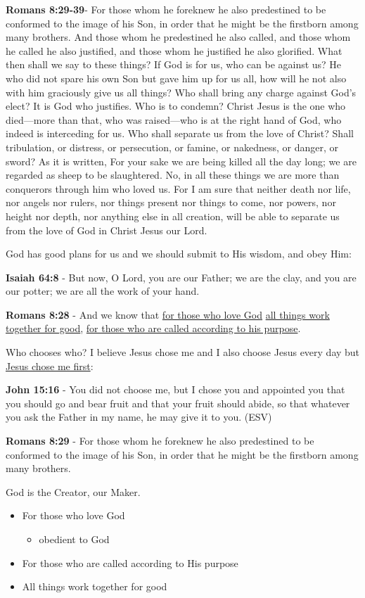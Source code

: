 \documentclass[11pt]{article}
\begin{document}
\textbf{Romans 8:29-39}- For those whom he foreknew he also predestined to be conformed to the image of his Son, in order that he might be the firstborn among many brothers. And those whom he predestined he also called, and those whom he called he also justified, and those whom he justified he also glorified. What then shall we say to these things? If God is for us, who can be against us? He who did not spare his own Son but gave him up for us all, how will he not also with him graciously give us all things? Who shall bring any charge against God's elect? It is God who justifies. Who is to condemn? Christ Jesus is the one who died—more than that, who was raised—who is at the right hand of God, who indeed is interceding for us. Who shall separate us from the love of Christ? Shall tribulation, or distress, or persecution, or famine, or nakedness, or danger, or sword? As it is written, For your sake we are being killed all the day long; we are regarded as sheep to be slaughtered. No, in all these things we are more than conquerors through him who loved us. For I am sure that neither death nor life, nor angels nor rulers, nor things present nor things to come, nor powers, nor height nor depth, nor anything else in all creation, will be able to separate us from the love of God in Christ Jesus our Lord.

God has good plans for us and we should submit to His wisdom, and obey Him:

\textbf{Isaiah 64:8} - But now, O Lord, you are our Father; we are the clay, and you are our potter; we are all the work of your hand.

\textbf{Romans 8:28} - And we know that \uline{for those who love God} \uline{all things work together for good}, \uline{for those who are called according to his purpose}.

Who chooses who? I believe Jesus chose me and I also choose Jesus every day but \uline{Jesus chose me first}:

\textbf{John 15:16} - You did not choose me, but I chose you and appointed you that you should go and bear fruit and that your fruit should abide, so that whatever you ask the Father in my name, he may give it to you. (ESV)

\textbf{Romans 8:29} - For those whom he foreknew he also predestined to be conformed to the image of his Son, in order that he might be the firstborn among many brothers.

God is the Creator, our Maker.

\begin{itemize}
\item For those who love God
\begin{itemize}
\item obedient to God
\end{itemize}
\item For those who are called according to His purpose
\item All things work together for good
\end{itemize}
\end{document}
